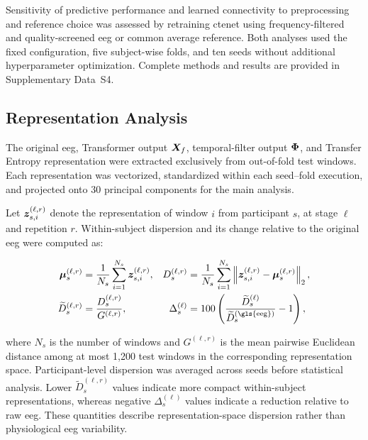 {Sensitivity of predictive performance and learned connectivity to preprocessing and reference choice was assessed by retraining \gls{ctenet} using frequency-filtered and quality-screened \gls{eeg} or common average reference. Both analyses used the fixed configuration, five subject-wise folds, and ten seeds without additional hyperparameter optimization. Complete methods and results are provided in Supplementary Data~S4.}
\subsection{Representation Analysis}
\label{subsec:representation_analysis}

The original \gls{eeg}, Transformer output ${\bm{X}}_{f}$, temporal-filter output ${\bm{\Phi}}$, and Transfer Entropy representation were extracted exclusively from out-of-fold test windows. Each representation was vectorized, standardized within each seed--fold execution, and projected onto 30 principal components for the main analysis.

Let ${\bm{z}}_{s,i}^{(\ell,r)}$ denote the representation of window $i$ from participant $s$, at stage $\ell$ and repetition $r$. Within-subject dispersion and its change relative to the original \gls{eeg} were computed as:

\begin{equation}
\begin{aligned}
\boldsymbol{\mu}_{s}^{(\ell,r)}
&=\frac{1}{N_s}\sum_{i=1}^{N_s}\ve{z}_{s,i}^{(\ell,r)},
&
D_s^{(\ell,r)}
&=\frac{1}{N_s}\sum_{i=1}^{N_s}
\left\|
\ve{z}_{s,i}^{(\ell,r)}
-\boldsymbol{\mu}_{s}^{(\ell,r)}
\right\|_2,
\\
\widetilde{D}_s^{(\ell,r)}
&=\frac{D_s^{(\ell,r)}}{G^{(\ell,r)}},
&
\Delta_s^{(\ell)}
&=100\left(
\frac{\widetilde{D}_s^{(\ell)}}
     {\widetilde{D}_s^{(\mathrm{\gls{eeg}})}}
-1\right),
\end{aligned}
\label{eq:representation_dispersion}
\end{equation}

where $N_s$ is the number of windows and $G^{(\ell,r)}$ is the mean pairwise Euclidean distance among at most 1,200 test windows in the corresponding representation space. Participant-level dispersion was averaged across seeds before statistical analysis. Lower $\widetilde{D}_s^{(\ell,r)}$ values indicate more compact within-subject representations, whereas negative $\Delta_s^{(\ell)}$ values indicate a reduction relative to raw \gls{eeg}. These quantities describe representation-space dispersion rather than physiological \gls{eeg} variability.

